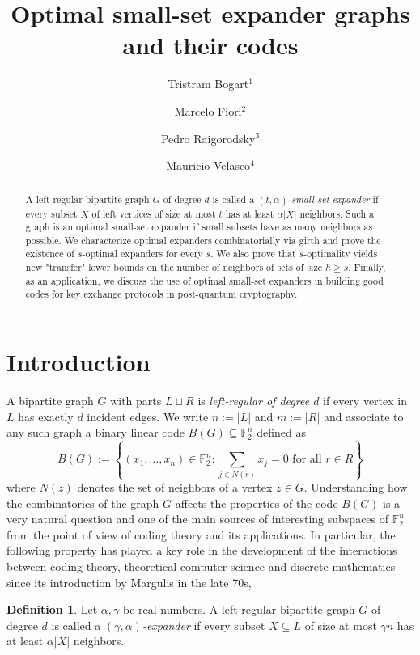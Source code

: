 \documentclass[12pt]{amsart}
\title{Optimal small-set expander graphs and their codes}
\author{Tristram Bogart$^{1}$}
\author{Marcelo Fiori$^{2}$}
\author{Pedro Raigorodsky$^{3}$}
\author{Mauricio Velasco$^{4}$}
\theoremstyle{definition}
\newtheorem{defi}[lemma]{Definition}
\renewcommand{\geq}{\geqslant}
\newcommand{\FF}{\ensuremath{\mathbb{F}}}
\newcommand{\1}{\ensuremath{\mathbb{1}}}
\begin{document}
\begin{abstract} A left-regular bipartite graph $G$ of degree $d$ is called a {\it $(t,\alpha)$-small-set-expander} if every subset $X$ of left vertices of size at most $t$ has at least $\alpha |X|$ neighbors. Such a graph is an optimal small-set expander if small subsets have as many neighbors as possible. We characterize optimal expanders combinatorially via girth and prove the existence of $s$-optimal expanders for every $s$. We also prove that $s$-optimality yields new "transfer" lower bounds on the number of neighbors of sets of size $h\geq s$. Finally, as an application, we discuss the use of optimal small-set expanders in building good codes for key exchange protocols in post-quantum cryptography.
\end{abstract}

\medskip

\maketitle



\medskip

\section{Introduction}

A bipartite graph $G$ with parts $L\sqcup R$ is {\it left-regular of degree $d$} if every vertex in $L$ has exactly $d$ incident edges. We write $n:=|L|$ and $m:=|R|$ and associate to any such graph a binary linear code $B(G)\subseteq \FF_2^n$ defined as
\[B(G):=\left\{(x_1,\dots,x_n)\in \FF_2^{n}: \sum_{j\in N(r)} x_j = 0\text{ for all $r\in R$}\right\}\] 
where $N(z)$ denotes the set of neighbors of a vertex $z\in G$. Understanding how the combinatorics of the graph $G$ affects the properties of the code $B(G)$ is a very natural question and one of the main sources of interesting subspaces of $\FF_2^n$ from the point of view of coding theory and its applications. In particular, the following property has played a key role in the development of the interactions between coding theory, theoretical computer science and discrete mathematics since its introduction by Margulis in the late 70s,

\begin{defi}Let $\alpha,\gamma$ be real numbers. A left-regular bipartite graph $G$ of degree $d$ is called a {\it $(\gamma,\alpha)$-expander} if every subset $X\subseteq L$ of size at most $\gamma n$ has at least $\alpha |X|$ neighbors.
\end{defi}
\end{document}
